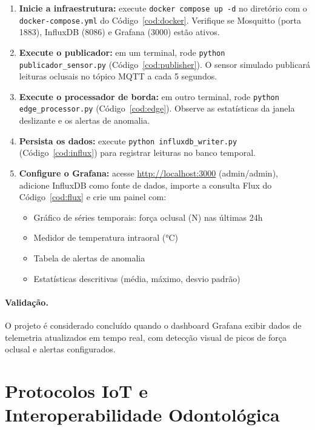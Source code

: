 \begin{enumerate}
    \item \textbf{Inicie a infraestrutura:} execute \texttt{docker compose up -d} no diretório com o \texttt{docker-compose.yml} do Código~\ref{cod:docker}. Verifique se Mosquitto (porta 1883), InfluxDB (8086) e Grafana (3000) estão ativos.

    \item \textbf{Execute o publicador:} em um terminal, rode \texttt{python publicador\_sensor.py} (Código~\ref{cod:publisher}). O sensor simulado publicará leituras oclusais no tópico MQTT a cada 5 segundos.

    \item \textbf{Execute o processador de borda:} em outro terminal, rode \texttt{python edge\_processor.py} (Código~\ref{cod:edge}). Observe as estatísticas da janela deslizante e os alertas de anomalia.

    \item \textbf{Persista os dados:} execute \texttt{python influxdb\_writer.py} (Código~\ref{cod:influx}) para registrar leituras no banco temporal.

    \item \textbf{Configure o Grafana:} acesse \url{http://localhost:3000} (admin/admin), adicione InfluxDB como fonte de dados, importe a consulta Flux do Código~\ref{cod:flux} e crie um painel com:
    \begin{itemize}
        \item Gráfico de séries temporais: força oclusal (N) nas últimas 24h
        \item Medidor de temperatura intraoral (°C)
        \item Tabela de alertas de anomalia
        \item Estatísticas descritivas (média, máximo, desvio padrão)
    \end{itemize}
\end{enumerate}

\paragraph{Validação.} O projeto é considerado concluído quando o dashboard Grafana exibir dados de telemetria atualizados em tempo real, com detecção visual de picos de força oclusal e alertas configurados.

\section{Protocolos IoT e Interoperabilidade Odontológica}


